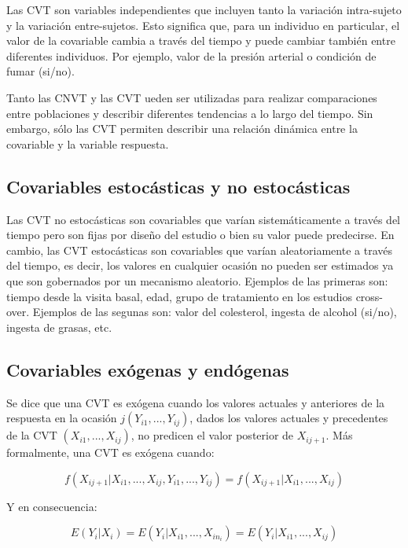 \documentclass[spanish]{article}
\numberwithin{figure}{subsection}
\numberwithin{equation}{subsection}
\numberwithin{table}{subsection}
\begin{document}
Las CVT son variables independientes que incluyen tanto la variación
intra-sujeto y la variación entre-sujetos. Esto significa que, para un
individuo en particular, el valor de la covariable cambia a través del tiempo y
puede cambiar también entre diferentes individuos. Por ejemplo, valor de la
presión arterial o condición de fumar (si/no).

Tanto las CNVT y las CVT ueden ser utilizadas para realizar comparaciones entre
poblaciones y describir diferentes tendencias a lo largo del tiempo. Sin
embargo, sólo las CVT permiten describir una relación dinámica entre la
covariable y la variable respuesta.

\subsection{Covariables estocásticas y no estocásticas}

Las CVT no estocásticas son covariables que varían sistemáticamente a través
del tiempo pero son fijas por diseño del estudio o bien su valor puede
predecirse. En cambio, las CVT estocásticas son covariables que varían
aleatoriamente a través del tiempo, es decir, los valores en cualquier ocasión
no pueden ser estimados ya que son gobernados por un mecanismo aleatorio.
Ejemplos de las primeras son: tiempo desde la visita basal, edad, grupo de
tratamiento en los estudios cross-over. Ejemplos de las segunas son: valor del
colesterol, ingesta de alcohol (si/no), ingesta de grasas, etc.

\subsection{Covariables exógenas y endógenas}

Se dice que una CVT es exógena cuando los valores actuales y anteriores de la
respuesta en la ocasión $j (Y_{i1}, ..., Y_{ij})$, dados los valores actuales y
precedentes de la CVT $(X_{i1}, ..., X_{ij})$, no predicen el valor posterior
de $X_{ij+1}$. Más formalmente, una CVT es exógena cuando:

\begin{equation}
	\label{exogeneidad}
	f(X_{ij+1}|X_{i1}, ..., X_{ij}, Y_{i1}, ..., Y_{ij}) =
	f(X_{ij+1}|X_{i1}, ..., X_{ij})
\end{equation}

Y en consecuencia:

\begin{equation}
	\label{exogeneidad debil}
	E(Y_i|X_i) = E(Y_i|X_{i1}, ..., X_{in_i}) = E(Y_i|X_{i1}, ..., X_{ij})
\end{equation}
\end{document}
